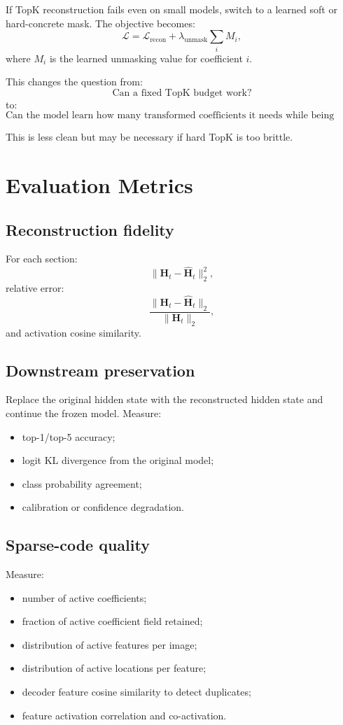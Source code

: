 \documentclass[11pt]{article}
\newcommand{\Htens}{\mathbf{H}}
\newcommand{\Hhat}{\widehat{\mathbf{H}}}
\begin{document}
If TopK reconstruction fails even on small models, switch to a learned soft or hard-concrete mask. The objective becomes:
\[
\mathcal{L}
=
\mathcal{L}_{\mathrm{recon}}
+
\lambda_{\mathrm{unmask}}
\sum_i M_i,
\]
where \(M_i\) is the learned unmasking value for coefficient \(i\).

This changes the question from:
\[
\text{Can a fixed TopK budget work?}
\]
to:
\[
\text{Can the model learn how many transformed coefficients it needs while being penalized for unmasking too many?}
\]

This is less clean but may be necessary if hard TopK is too brittle.

\section{Evaluation Metrics}

\subsection{Reconstruction fidelity}

For each section:
\[
\|\Htens_t-\Hhat_t\|_2^2,
\]
relative error:
\[
\frac{\|\Htens_t-\Hhat_t\|_2}{\|\Htens_t\|_2},
\]
and activation cosine similarity.

\subsection{Downstream preservation}

Replace the original hidden state with the reconstructed hidden state and continue the frozen model. Measure:
\begin{itemize}[leftmargin=*]
    \item top-1/top-5 accuracy;
    \item logit KL divergence from the original model;
    \item class probability agreement;
    \item calibration or confidence degradation.
\end{itemize}

\subsection{Sparse-code quality}

Measure:
\begin{itemize}[leftmargin=*]
    \item number of active coefficients;
    \item fraction of active coefficient field retained;
    \item distribution of active features per image;
    \item distribution of active locations per feature;
    \item decoder feature cosine similarity to detect duplicates;
    \item feature activation correlation and co-activation.
\end{itemize}
\end{document}
